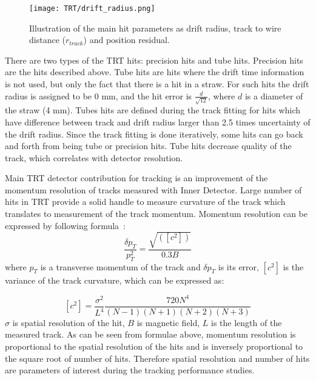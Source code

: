 \begin{figure}
\centering
\texttt{[image: TRT/drift\_radius.png]}
\caption{ 
 Illustration of the main hit parameters as drift radius, track to wire distance ($r_{track}$) and position residual.
}
\label{fig:drift_radius}
\end{figure}

There are two types of the TRT hits: precision hits and tube hits. Precision hits are the hits described above. Tube hits are hits where the drift time 
information is not used, but only the fact that there is a hit in a straw. For such hits the drift radius is assigned to be 0 mm, and the hit error is $\frac{d}{\sqrt{12}}$, where
$d$ is a diameter of the straw (4 mm). Tubes hits are defined during the track fitting for hits which have difference between track and drift radius larger than
2.5 times uncertainty of the drift radius. Since the track fitting is done iteratively, some hits can go back and forth from being tube or precision hits.
Tube hits decrease quality of the track, which correlates with detector resolution.

Main TRT detector contribution for tracking is an improvement of the momentum resolution of tracks measured with Inner Detector. Large number of hits in TRT provide
a solid handle to measure curvature of the track which translates to measurement of the track momentum. Momentum resolution can be expressed by following formula~\cite{mom_res_book,Gluckstern:1963ng}:
\begin{equation}
\dfrac{\delta p_T}{p_T^2} = \dfrac{\sqrt{([c^2])}}{0.3B}
 \label{eq:momentum_resolution}
\end{equation}
where $p_T$ is a transverse momentum of the track and $\delta p_T$ is its error, $[c^2]$ is the variance of the track curvature, which can be expressed as:

\begin{equation}
[c^2] = \dfrac{\sigma^2}{L^4}\dfrac{720 N^4}{(N-1)(N+1)(N+2)(N+3)}
\end{equation}
$\sigma$ is spatial resolution of the hit, $B$ is magnetic field, $L$ is the length of the measured track.
As can be seen from formulae above, momentum resolution is proportional to the spatial resolution of the hits and is inversely proportional to the square root of 
number of hits. Therefore spatial resolution and number of hits are parameters of interest during the tracking performance studies.

